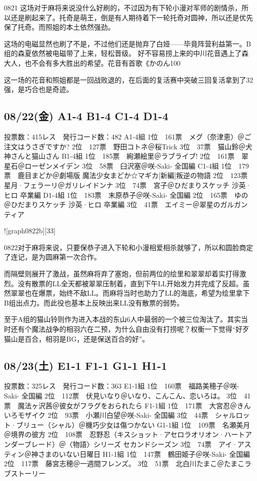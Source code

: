 0821 这场对于麻将来说没什么好刷的，不过因为有下轮小漫对军师的剧情杀，所以还是刷起来了。托奇是萌王，倒是有人期待着下一轮托奇对圆神，所以还是优先保了托奇。而照姐的本土依然强劲。

这场的电磁显然也刷了不是，不过他们还是抛弃了白娅——毕竟阵营利益第一。B组的森夏依然被电磁带了上来，轻松晋级。
好不容易捞上来的中川花音遇上了森大人，也不会有多大胜出的希望。花音有首歌《かのん100%

这一场的花音和照姐都是一回战败退的，在后面的复活赛中突破三回复活拿到了32强，是巧合也是奇迹。

\subsection{08/22(金) A1-4 B1-4 C1-4 D1-4}

    投票数：415レス　発行コード数：482
    A1-4組
    1位　161票　メグ（奈津恵）＠ご注文はうさぎですか?
    2位　127票　野田コトネ＠桜Trick
    3位　37票　猫山鈴＠犬神さんと猫山さん
    B1-4組
    1位　185票　絢瀬絵里＠ラブライブ!
    2位　161票　翠星石＠ローゼンメイデン
    3位　58票　臼沢塞＠咲-Saki- 全国編
    C1-4組
    1位　179票　鹿目まどか＠劇場版 魔法少女まどか☆マギカ[新編]叛逆の物語
    2位　123票　星月·フェラーリ＠ガリレイドンナ
    3位　74票　宮子＠ひだまりスケッチ 沙英·ヒロ 卒業編
    D1-4組
    1位　183票　末原恭子＠咲-Saki- 全国編
    2位　165票　ゆの＠ひだまりスケッチ 沙英·ヒロ 卒業編
    3位　41票　エイミー＠翠星のガルガンティア

![graph0822b][33]

0822对于麻将来说，只要保恭子进入下轮和小漫相爱相杀就够了，所以和圆脸商定了连记，是为圆麻第一次合作。

而隔壁则展开了激战，虽然麻将弃了塞炮，但前两位的绘里和翠翠却着实打得激烈。没有散票的LL全天都被翠翠压制着，直到下午LL开始发力并完成了反超。虽然翠翠也在爆票，始终不敌LL。而麻将当时也助力了LL的海底，希望为绘里拿下B组出点力。而此役也基本上反映出来LL没有散票的弱势。

至于A组的猫山铃则作为进入本战的东山6人中最弱的一个被三位淘汰了。其实当时还有个魔法战争的相羽六在二预，为什么自由没有打捞呢？权衡一下觉得“好歹猫山是百合，相羽是BG，还是保送百合的好”。

\subsection{08/23(土) E1-1 F1-1 G1-1 H1-1}

    投票数：325レス　発行コード数：363
    E1-1組
    1位　160票　福路美穂子＠咲-Saki- 全国編
    2位　112票　伏見いなり＠いなり、こんこん、恋いろは。
    3位　41票　魔法ヶ沢茜＠彼女がフラグをおられたら
    F1-1組
    1位　171票　大宮忍＠きんいろモザイク
    2位　93票　小瀬川白望＠咲-Saki- 全国編
    3位　44票　シャルロット·ブリュー（シャル）＠機巧少女は傷つかない
    G1-1組
    1位　109票　名瀬美月＠境界の彼方
    2位　108票　忍野忍（キスショット·アセロラオリオン·ハートアンダーブレード）＠〈物語〉シリーズ セカンドシーズン
    3位　74票　アイ·アスティン＠神さまのいない日曜日
    H1-1組
    1位　147票　鶴田姫子＠咲-Saki- 全国編
    2位　117票　藤宮志穂＠一週間フレンズ。
    3位　51票　北白川たまこ＠たまこラブストーリー

